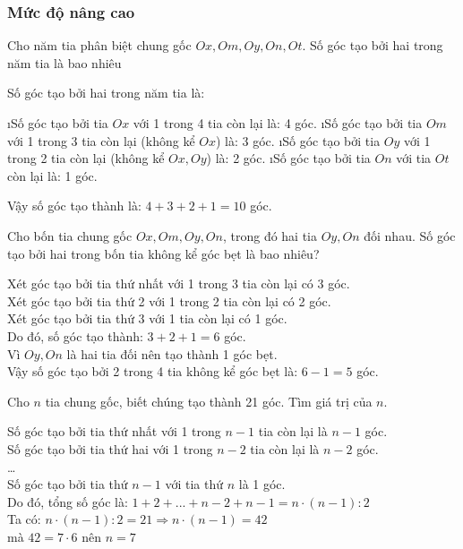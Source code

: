\subsubsection{Mức độ nâng cao}
\begin{bt}
	Cho năm tia phân biệt chung gốc $Ox,Om,Oy,On,Ot$. Số góc tạo bởi hai trong năm tia là bao nhiêu
	\begin{loigiaichuong30}
		Số góc tạo bởi hai trong năm tia là:
		\begin{enumerate}[--,leftmargin=*]
			\i Số góc tạo bởi tia $Ox$ với 1 trong 4 tia còn lại là: 4 góc.
			\i Số góc tạo bởi tia $Om$ với 1 trong 3 tia còn lại (không kể $Ox$) là: 3 góc.
			\i Số góc tạo bởi tia $Oy$ với 1 trong 2 tia còn lại (không kể $Ox,Oy$) là: 2 góc.
			\i Số góc tạo bởi tia $On$ với tia $Ot$ còn lại là: 1 góc.
		\end{enumerate}
		Vậy số góc tạo thành là: $4+3+2+1=10$ góc.
	\end{loigiaichuong30}
\end{bt}
\begin{bt}
	Cho bốn tia chung gốc $Ox,Om,Oy,On$, trong đó hai tia $Oy,On$ đối nhau. Số góc tạo bởi hai trong bốn tia không kể góc bẹt là bao nhiêu?
	\begin{loigiaichuong30}
		Xét góc tạo bởi tia thứ nhất với 1 trong 3 tia còn lại có 3 góc.\\
		Xét góc tạo bởi tia thứ 2 với 1 trong 2 tia còn lại có 2 góc.\\
		Xét góc tạo bởi tia thứ 3 với 1 tia còn lại có 1 góc.\\
		Do đó, số góc tạo thành: $3+2+1=6$ góc.\\
		Vì $Oy,On$ là hai tia đối nên tạo thành 1 góc bẹt.\\
		Vậy số góc tạo bởi 2 trong 4 tia không kể góc bẹt là: $6-1=5$ góc.
	\end{loigiaichuong30}
\end{bt}
\begin{bt}
	Cho $n$ tia chung gốc, biết chúng tạo thành 21 góc. Tìm giá trị của $n$.
	\begin{loigiaichuong30}
		Số góc tạo bởi tia thứ nhất với 1 trong $n-1$ tia còn lại là $n-1$ góc.\\
		Số góc tạo bởi tia thứ hai với 1 trong $n-2$ tia còn lại là $n-2$ góc.\\
		\ldots \\
		Số góc tạo bởi tia thứ $n-1$ với tia thứ $n$ là 1 góc.\\
		Do đó, tổng số góc là: $1+2+...+n-2+n-1=n\cdot\left( n-1 \right):2$\\
		Ta có: $n\cdot\left( n-1 \right):2=21\Rightarrow n\cdot\left( n-1 \right)=42$\\
		mà $42=7\cdot6$ nên $n=7$
	\end{loigiaichuong30}
\end{bt} 
